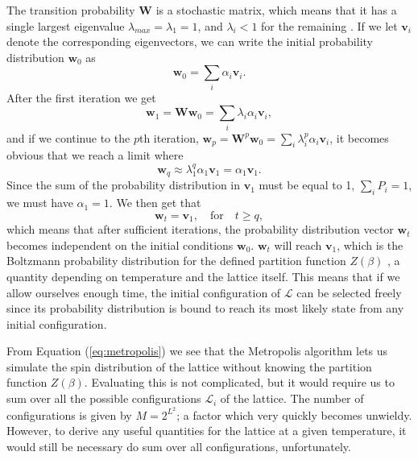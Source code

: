 \documentclass[]{article}
\begin{document}
The transition probability $\mathbf{W}$ is a stochastic matrix, which means that it has a single largest eigenvalue $\lambda_{max} = \lambda_1 = 1$, and $\lambda_i < 1$ for the remaining \cite{fys4150-notes}. If we let $\mathbf{v}_i$ denote the corresponding eigenvectors, we can write the initial probability distribution $\mathbf{w}_{0}$ as
\begin{equation} \label{eq:initial-state}
	\mathbf{w}_{0} = \sum_{i} \alpha_i \mathbf{v}_i.
\end{equation}
After the first iteration we get
\begin{equation}
	\mathbf{w}_{1} = \mathbf{W} \mathbf{w}_{0} = \sum_{i} \lambda_i \alpha_i \mathbf{v}_i,
\end{equation}
and if we continue to the $p$th iteration, $\mathbf{w}_{p} = \mathbf{W}^p \mathbf{w}_{0} = \sum_{i} \lambda_i^p \alpha_i \mathbf{v}_i$, it becomes obvious that we reach a limit where
\begin{equation}
	\mathbf{w}_{q} \approx \lambda_1^q \alpha_1 \mathbf{v}_1 = \alpha_1 \mathbf{v}_1.
\end{equation}
Since the sum of the probability distribution in $\mathbf{v}_1$ must be equal to 1, $\sum_{i} P_i = 1$, we must have $\alpha_1 = 1$. We then get that
\begin{equation} \label{eq:steady-state}
	\mathbf{w}_{t} = \mathbf{v}_1, \quad \text{for} \quad t \ge q,
\end{equation}
which means that after sufficient iterations, the probability distribution vector $\mathbf{w}_{t}$ becomes independent on the initial conditions $\mathbf{w}_{0}$. $\mathbf{w}_{t}$ will reach $\mathbf{v}_1$, which is the Boltzmann probability distribution for the defined partition function $Z(\beta)$ \cite{newman1999monte}, a quantity depending on temperature and the lattice itself. This means that if we allow ourselves enough time, the initial configuration of $\mathcal{L}$ can be selected freely since its probability distribution is bound to reach its most likely state from any initial configuration.

\vspace{5mm}

From Equation (\ref{eq:metropolis}) we see that the Metropolis algorithm lets us simulate the spin distribution of the lattice without knowing the partition function $Z(\beta)$. Evaluating this is not complicated, but it would require us to sum over all the possible configurations $\mathcal{L}_i$ of the lattice. The number of configurations is given by $M = 2^{L^2}$; a factor which very quickly becomes unwieldy. However, to derive any useful quantities for the lattice at a given temperature, it would still be necessary do sum over all configurations, unfortunately.
\end{document}
